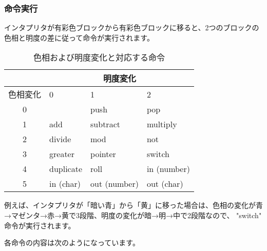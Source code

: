 \subsubsection{命令実行}
インタプリタが有彩色ブロックから有彩色ブロックに移ると、2つのブロックの色相と明度の差に従って命令が実行されます。

\begin{table}[htb]
  \caption{色相および明度変化と対応する命令}
  \begin{tabular}{c||lll}
            & \multicolumn{3}{c}{明度変化}\\ \hline
    色相変化 & 0         & 1            & 2\\ \hline
    0       &           & push         & pop\\
    1       & add       & subtract     & multiply\\
    2       & divide    & mod          & not\\
    3       & greater   & pointer      & switch\\
    4       & duplicate & roll         & in (number)\\
    5       & in (char) & out (number) & out (char)
  \end{tabular}
\end{table}

例えば、インタプリタが「暗い青」から「黄」に移った場合は、色相の変化が青→マゼンタ→赤→黄で3段階、明度の変化が暗→明→中で2段階なので、 "switch" 命令が実行されます。

各命令の内容は次のようになっています。

